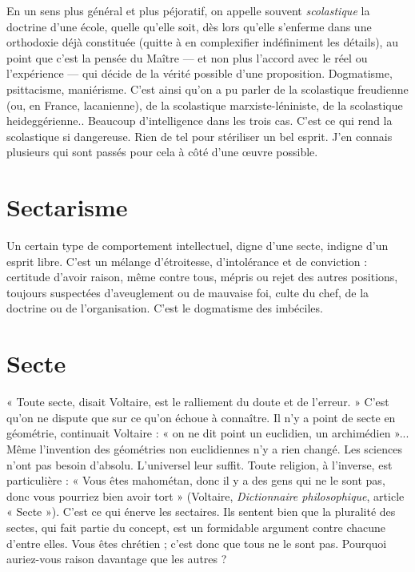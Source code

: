 En un sens plus général et plus péjoratif, on appelle souvent {\it scolastique} la
doctrine d’une école, quelle qu’elle soit, dès lors qu’elle s’enferme dans une
orthodoxie déjà constituée (quitte à en complexifier indéfiniment les détails),
au point que c’est la pensée du Maître — et non plus l’accord avec le réel ou
l'expérience — qui décide de la vérité possible d’une proposition. Dogmatisme,
psittacisme, maniérisme. C’est ainsi qu’on a pu parler de la scolastique freudienne
(ou, en France, lacanienne), de la scolastique marxiste-léniniste, de la
scolastique heideggérienne.. Beaucoup d'intelligence dans les trois cas. C’est
ce qui rend la scolastique si dangereuse. Rien de tel pour stériliser un bel esprit.
J'en connais plusieurs qui sont passés pour cela à côté d’une œuvre possible.

\section{Sectarisme}
Un certain type de comportement intellectuel, digne d’une
secte, indigne d’un esprit libre. C’est un mélange d’étroitesse,
d’intolérance et de conviction : certitude d’avoir raison, même contre tous,
mépris ou rejet des autres positions, toujours suspectées d’aveuglement ou de
mauvaise foi, culte du chef, de la doctrine ou de l’organisation. C’est le dogmatisme
des imbéciles.

\section{Secte}
« Toute secte, disait Voltaire, est le ralliement du doute et de l’erreur. »
C’est qu’on ne dispute que sur ce qu’on échoue à connaître.
Il n’y a point de secte en géométrie, continuait Voltaire : « on ne dit point un
euclidien, un archimédien »... Même l'invention des géométries non euclidiennes
n’y a rien changé. Les sciences n’ont pas besoin d’absolu. L’universel
leur suffit. Toute religion, à l'inverse, est particulière : « Vous êtes mahométan,
donc il y a des gens qui ne le sont pas, donc vous pourriez bien avoir tort »
(Voltaire, {\it Dictionnaire philosophique}, article « Secte »). C’est ce qui énerve les
sectaires. Ils sentent bien que la pluralité des sectes, qui fait partie du concept,
est un formidable argument contre chacune d’entre elles. Vous êtes chrétien ;
c’est donc que tous ne le sont pas. Pourquoi auriez-vous raison davantage que
les autres ?

